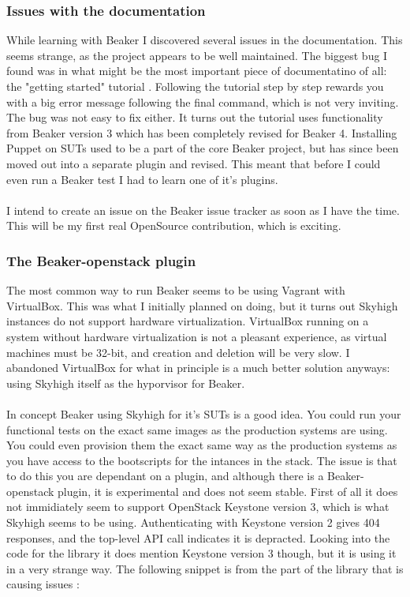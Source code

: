 \subsubsection{Issues with the documentation}

While learning with Beaker I discovered several issues in the documentation. This seems strange, as the project appears to be well maintained. The biggest bug I found was in what might be the most important piece of documentatino of all: the "getting started" tutorial \cite{beakertutorialwithproblem}. Following the tutorial step by step rewards you with a big error message following the final command, which is not very inviting. The bug was not easy to fix either. It turns out the tutorial uses functionality from Beaker version 3 which has been completely revised for Beaker 4. Installing Puppet on SUTs used to be a part of the core Beaker project, but has since been moved out into a separate plugin and revised. This meant that before I could even run a Beaker test I had to learn one of it's plugins.
\\
\\
I intend to create an issue on the Beaker issue tracker \cite{beakerissuetracker} as soon as I have the time. This will be my first real OpenSource contribution, which is exciting.

\subsubsection{The Beaker-openstack plugin}

The most common way to run Beaker seems to be using Vagrant with VirtualBox. This was what I initially planned on doing, but it turns out Skyhigh instances do not support hardware virtualization. VirtualBox running on a system without hardware virtualization is not a pleasant experience, as virtual machines must be 32-bit, and creation and deletion will be very slow. I abandoned VirtualBox for what in principle is a much better solution anyways: using Skyhigh itself as the hyporvisor for Beaker.
\\
\\
In concept Beaker using Skyhigh for it's SUTs is a good idea. You could run your functional tests on the exact same images as the production systems are using. You could even provision them the exact same way as the production systems as you have access to the bootscripts for the intances in the stack. The issue is that to do this you are dependant on a plugin, and although there is a Beaker-openstack plugin, it is experimental and does not seem stable. First of all it does not immidiately seem to support OpenStack Keystone version 3, which is what Skyhigh seems to be using. Authenticating with Keystone version 2 gives 404 responses, and the top-level API call indicates it is depracted. Looking into the code for the library it does mention Keystone version 3 though, but it is using it in a very strange way. The following snippet is from the part of the library that is causing issues \cite{beakeropenstackproblematicpart}:

